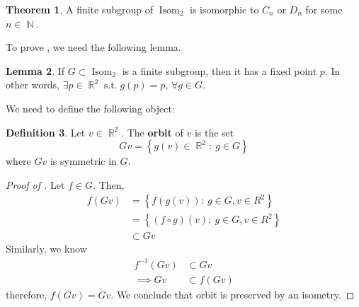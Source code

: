 \documentclass[11pt]{amsart} %
\theoremstyle{definition}
\newtheorem{definition}{Definition}[section]
\newtheorem{theorem}[definition]{Theorem}
\newtheorem{lemma}[definition]{Lemma}
\theoremstyle{definition}
\DeclareMathOperator{\N}{\mathbb{N}}
\DeclareMathOperator{\R}{\mathbb{R}}
\DeclareMathOperator{\suchthat}{\text{ s.t. }}
\DeclareMathOperator{\isom}{Isom}
\numberwithin{equation}{section}
\newcommand{\condset}[4]{\left\{ #1  : \: #2 #3 #4 \right\}}
\begin{document}
\begin{theorem}
	\label{thmclassificationisom2}
	A finite subgroup of $\isom_2$ is isomorphic to $C_n$ or $D_n$ for some $n \in \N$.
\end{theorem}

To prove , we need the following lemma.

\begin{lemma}
	\label{lemfixedpointp}
	If $G \subset \isom_2$ is a finite subgroup, then it has a fixed point $p$. In other words, $\exists p \in \R^2 \suchthat g(p)=p$, $\forall g\in G$. 
\end{lemma}

We need to define the following object:

\begin{definition}
	Let $v \in \R^2$. The \textbf{orbit} of $v$ is the set
	$$ Gv = \condset{ g(v) \in \R^2}{ g \in G}{}{} $$
	where $Gv $ is symmetric in $G$.
\end{definition}

\begin{proof}[Proof of ]
	Let $f \in G$. Then,
	\begin{align*}
	f (Gv) &= \condset{ f(g(v))}{ g \in G}{,}{ v\in R^2} \\
	&= \condset{ (f \circ g)(v) }{ g \in G}{,}{ v\in R^2} \\
	&\subset Gv
	\end{align*}
	Similarly, we know
	\begin{align*}
	f^{-1} (Gv) &\subset Gv \\
	\implies Gv &\subset f(Gv)
	\end{align*}
	therefore, $f(Gv)=Gv$. We conclude that orbit is preserved by an isometry.
\end{proof}
\end{document}

